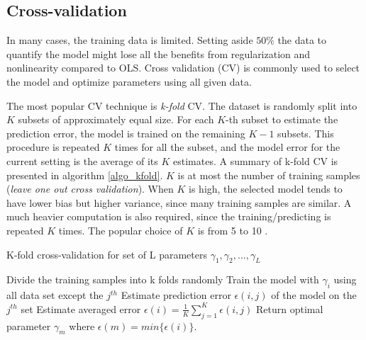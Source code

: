 \subsection{Cross-validation}
In many cases, the training data is limited. Setting aside $ 50 \% $ the data to quantify the model might lose all the benefits from regularization and nonlinearity compared to OLS. Cross validation (CV) is commonly used to select the model and optimize parameters using all given data. 

The most popular CV technique is \textit{k-fold} CV. The dataset is randomly split into $ K $ subsets of approximately equal size. For each $ K $-th subset to estimate the prediction error, the model is trained on the remaining $ K-1 $ subsets. This procedure is repeated $ K $ times for all the subset, and the model error for the current setting is the average of its $ K $ estimates. A summary of k-fold CV is presented in algorithm \ref{algo_kfold}. $ K $ is at most the number of training samples (\textit{leave one out cross validation}). When $ K $ is high, the selected model tends to have lower bias but higher variance, since many training samples are similar. A much heavier computation is also required, since the training/predicting is repeated $ K $ times. The popular choice of $ K $ is from 5 to 10 \citep{breiman1992submodel, kohavi1995study}. 

\begin{algorithm}[t]
\caption{K-fold cross-validation for set of L parameters $ \gamma_1, \gamma_2, ..., \gamma_L $} \label{algo_kfold}
\begin{algorithmic}[1]
	\State Divide the training samples into k folds randomly
			\State Train the model with $ \gamma_i $ using all data set except the $ j^{th} $
			\State Estimate prediction error $ \epsilon(i,j) $ of the model on the $ j^{th} $ set
		\EndFor
	\EndFor
	\State Estimate averaged error $ \epsilon(i) = \frac{1}{K}\sum\limits_{j=1}^{K}\epsilon(i,j)$
	\State Return optimal parameter $ \gamma_m $ where $ \epsilon(m) = min \{\epsilon(i)\}$.
\end{algorithmic}
\end{algorithm}

